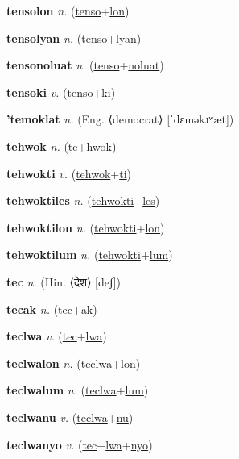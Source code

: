 \textbf{\hypertarget{tensolon}{tensolon}} \textit{n.} (\hyperlink{tenso}{tenso}+\allowbreak \hyperlink{lon}{lon})


\textbf{\hypertarget{tensolyan}{tensolyan}} \textit{n.} (\hyperlink{tenso}{tenso}+\allowbreak \hyperlink{lyan}{lyan})


\textbf{\hypertarget{tensonoluat}{tensonoluat}} \textit{n.} (\hyperlink{tenso}{tenso}+\allowbreak \hyperlink{noluat}{noluat})


\textbf{\hypertarget{tensoki}{tensoki}} \textit{v.} (\hyperlink{tenso}{tenso}+\allowbreak \hyperlink{ki}{ki})


\textbf{\hypertarget{'temoklat}{'temoklat}} \textit{n.} (Eng. ⟨democrat⟩ [ˈdɛməkɹʷæt])


\textbf{\hypertarget{tehwok}{tehwok}} \textit{n.} (\hyperlink{te}{te}+\allowbreak \hyperlink{hwok}{hwok})


\textbf{\hypertarget{tehwokti}{tehwokti}} \textit{v.} (\hyperlink{tehwok}{tehwok}+\allowbreak \hyperlink{ti}{ti})


\textbf{\hypertarget{tehwoktiles}{tehwoktiles}} \textit{n.} (\hyperlink{tehwokti}{tehwokti}+\allowbreak \hyperlink{les}{les})


\textbf{\hypertarget{tehwoktilon}{tehwoktilon}} \textit{n.} (\hyperlink{tehwokti}{tehwokti}+\allowbreak \hyperlink{lon}{lon})


\textbf{\hypertarget{tehwoktilum}{tehwoktilum}} \textit{n.} (\hyperlink{tehwokti}{tehwokti}+\allowbreak \hyperlink{lum}{lum})


\textbf{\hypertarget{tec}{tec}} \textit{n.} (Hin. ⟨{\devanagari{}देश}⟩ [deʃ])


\textbf{\hypertarget{tecak}{tecak}} \textit{n.} (\hyperlink{tec}{tec}+\allowbreak \hyperlink{ak}{ak})


\textbf{\hypertarget{teclwa}{teclwa}} \textit{v.} (\hyperlink{tec}{tec}+\allowbreak \hyperlink{lwa}{lwa})


\textbf{\hypertarget{teclwalon}{teclwalon}} \textit{n.} (\hyperlink{teclwa}{teclwa}+\allowbreak \hyperlink{lon}{lon})


\textbf{\hypertarget{teclwalum}{teclwalum}} \textit{n.} (\hyperlink{teclwa}{teclwa}+\allowbreak \hyperlink{lum}{lum})


\textbf{\hypertarget{teclwanu}{teclwanu}} \textit{v.} (\hyperlink{teclwa}{teclwa}+\allowbreak \hyperlink{nu}{nu})


\textbf{\hypertarget{teclwanyo}{teclwanyo}} \textit{v.} (\hyperlink{tec}{tec}+\allowbreak \hyperlink{lwa}{lwa}+\allowbreak \hyperlink{nyo}{nyo})


